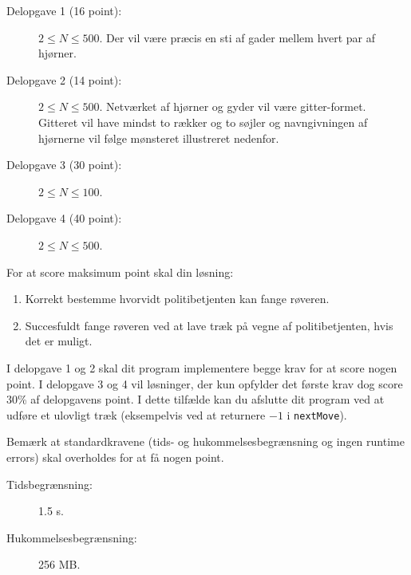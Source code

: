 \documentclass{boi2014-dk}
\begin{document}
    \Scoring
    \begin{description}
        \item[Delopgave 1 (16 point):] $2 \le N \le 500$.
        	  Der vil være præcis en sti af gader
        	  mellem hvert par af hjørner.
        \item[Delopgave 2 (14 point):] $2 \le N \le 500$.
        	  Netværket af hjørner og gyder vil være gitter-formet.
        	  Gitteret vil have mindst to rækker og to søjler og
        	  navngivningen af hjørnerne vil følge mønsteret illustreret
        	  nedenfor.
        \begin{figure}[h!]
           \centering
        \end{figure}
        \item[Delopgave 3 (30 point):] $2 \le N \le 100$.
        \item[Delopgave 4 (40 point):] $2 \le N \le 500$.
    \end{description}

    For at score maksimum point skal din løsning:
    \begin{enumerate}
    	\item Korrekt bestemme hvorvidt politibetjenten kan fange
   			  røveren.
   		\item Succesfuldt fange røveren ved at lave træk på
			  vegne af politibetjenten, hvis det er muligt.
    \end{enumerate}

    I delopgave 1 og 2 skal dit program implementere begge krav for at score
    nogen point. I delopgave 3 og 4 vil løsninger, der kun opfylder det første
	krav dog score 30\% af delopgavens point. I dette tilfælde kan du afslutte
    dit program ved at udføre et ulovligt træk (eksempelvis ved at returnere
    $-1$ i {\tt nextMove}).

    Bemærk at standardkravene (tids- og hukommelsesbegrænsning og ingen
    runtime errors) skal overholdes for at få nogen point.

    \Constraints

    \begin{description}
        \item[Tidsbegrænsning:] 1.5 s.
        \item[Hukommelsesbegrænsning:] 256 MB.
    \end{description}
\end{document}
